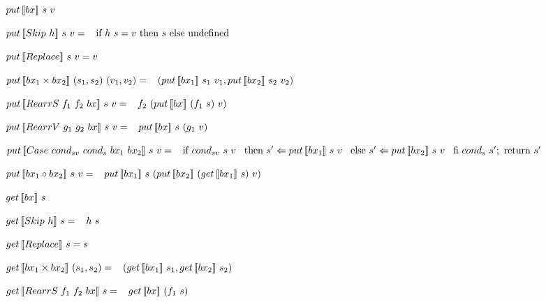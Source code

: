 \begin{multicols}{2}
    \begin{definition} \label{def:minbigulput}
        $put \, [\![bx]\!] \ s \ v$

        \noindent $put \, [\![Skip \ h]\!] \ s \ v = \\
            \hspace*{3mm} \textnormal{if} \ h \ s = v \ \textnormal{then} \ s \ \textnormal{else} \ \text{undefined}$
    
        \noindent $put \, [\![Replace]\!] \ s \ v = v$
    
        \noindent $put \, [\![bx_1 \times bx_2]\!] \ (s_1, s_2) \ (v_1, v_2) = \\
            \hspace*{3mm} (put \, [\![bx_1]\!] \ s_1 \ v_1,put \, [\![bx_2]\!] \ s_2 \ v_2)$
    
        \noindent $put \, [\![RearrS \ f_1 \ f_2 \ bx]\!] \ s \ v = \\
            \hspace*{3mm} f_2 \ (put \, [\![bx]\!] \ (f_1 \ s) \ v)$
    
        \noindent $put \, [\![RearrV \ g_1 \ g_2 \ bx]\!] \ s \ v = \\
            \hspace*{3mm} put \, [\![bx]\!] \ s \ (g_1 \ v)$
    
        \noindent $put \, [\![Case \ cond_{sv} \ cond_{s} \ bx_1 \ bx_2]\!] \ s \ v =\\
            \hspace*{3mm} \textnormal{if} \ {cond_{sv} \ s \ v} \\
            \hspace*{3mm} \textnormal{then} \ s' \Leftarrow put \, [\![bx_1]\!] \ s \ v \\
            \hspace*{3mm} \textnormal{else} \ s' \Leftarrow put \, [\![bx_2]\!] \ s \ v \\
            \hspace*{3mm} \textnormal{fi} \ cond_{s} \ s'; \ \textnormal{return} \ s'$
    
        \noindent $\putbx{bx_1 \circ bx_2}{s}{v} = \\
            \tab \putbx{bx_1}{s}{(\putbx{bx_2}{(\getbx{bx_1}{s})}{v})}$
    \end{definition}
\columnbreak
    \begin{definition} \label{def:minbigulget}
        $get \, [\![bx]\!] \ s$

        \noindent $get \, [\![Skip \ h]\!] \ s = \\ 
            \hspace*{3mm} h \ s$

        \noindent $get \, [\![Replace]\!] \ s = s$

        \noindent $get \, [\![bx_1 \times bx_2]\!] \ (s_1,s_2) = \\
            \hspace*{3mm} (get \, [\![bx_1]\!] \ s_1,get \, [\![bx_2]\!] \ s_2)$

        \noindent $get \, [\![RearrS \ f_1 \ f_2 \ bx]\!] \ s = \\ 
            \hspace*{3mm} get \, [\![bx]\!] \ (f_1 \ s)$


\end{definition}
\end{multicols}
